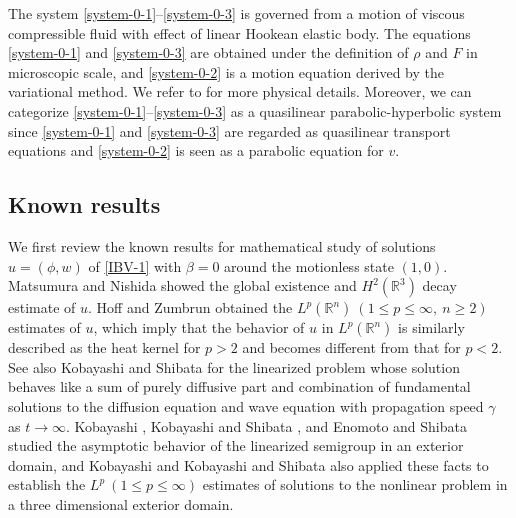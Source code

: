\documentclass[dvipdfmx,12pt]{article}
\begin{document}
The system \eqref{system-0-1}--\eqref{system-0-3} is governed from a motion of viscous compressible fluid with effect of linear Hookean elastic body. The equations \eqref{system-0-1} and \eqref{system-0-3} are obtained under the definition of $\rho$ and $F$ in microscopic scale, and \eqref{system-0-2} is a motion equation derived by the variational method. We refer to \cite{G81,LLZ05, SiTh04} for more physical details. Moreover, we can categorize  \eqref{system-0-1}--\eqref{system-0-3} as a quasilinear parabolic-hyperbolic system since \eqref{system-0-1} and \eqref{system-0-3} are regarded as  quasilinear transport equations and \eqref{system-0-2} is seen as a parabolic equation for $v$.   

\subsection{Known results}

We first review the known results for mathematical study of solutions $u=(\phi,w)$ of \eqref{IBV-1} with $\beta=0$ around the motionless state $(1,0)$. Matsumura and Nishida \cite{MN79} showed the global existence and $H^2(\mathbb{R}^3)$ decay estimate of $u$. Hoff and Zumbrun \cite{HZ95} obtained the $L^p(\mathbb{R}^n)~(1\le p\le \infty,~n\ge2)$ estimates of $u$, which imply that the behavior of $u$ in $L^p(\mathbb{R}^n)$ is similarly described as the heat kernel for $p>2$ and becomes different from that for $p<2$.
See also Kobayashi and Shibata \cite{KS02} for the linearized problem whose solution behaves like a sum of purely diffusive part and combination of fundamental solutions to the diffusion equation and wave equation with propagation speed $\gamma$ as $t\to\infty$.  Kobayashi \cite{K97}, Kobayashi and Shibata \cite{KS99}, and Enomoto and Shibata \cite{ES12,SE18} studied the asymptotic behavior of the linearized semigroup in an exterior domain, and Kobayashi \cite{K02-1,K02-2} and Kobayashi and Shibata \cite{KS99} also applied these facts to establish the $L^p~(1\le p\le \infty)$ estimates of solutions to the nonlinear problem in a three dimensional exterior domain.
\end{document}
